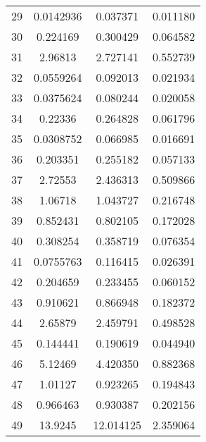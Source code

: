 \documentclass[a4paper,11pt,oneside,openany]{jsbook}
\begin{document}
\begin{table}[]
{\begin{tabular}{|c|c|c|c|}
29 & 0.0142936 & 0.037371 & 0.011180 \\
30 & 0.224169 & 0.300429 & 0.064582 \\
31 & 2.96813 & 2.727141 & 0.552739 \\
32 & 0.0559264 & 0.092013 & 0.021934 \\
33 & 0.0375624 & 0.080244 & 0.020058 \\
34 & 0.22336 & 0.264828 & 0.061796 \\
35 & 0.0308752 & 0.066985 & 0.016691 \\
36 & 0.203351 & 0.255182 & 0.057133 \\
37 & 2.72553 & 2.436313 & 0.509866 \\
38 & 1.06718 & 1.043727 & 0.216748 \\
39 & 0.852431 & 0.802105 & 0.172028 \\
40 & 0.308254 & 0.358719 & 0.076354 \\
41 & 0.0755763 & 0.116415 & 0.026391 \\
42 & 0.204659 & 0.233455 & 0.060152 \\
43 & 0.910621 & 0.866948 & 0.182372 \\
44 & 2.65879 & 2.459791 & 0.498528 \\
45 & 0.144441 & 0.190619 & 0.044940 \\
46 & 5.12469 & 4.420350 & 0.882368 \\
47 & 1.01127 & 0.923265 & 0.194843 \\
48 & 0.966463 & 0.930387 & 0.202156 \\
49 & 13.9245 & 12.014125 & 2.359064 \\ \hline
\end{tabular}
}
\end{table}
\end{document}
